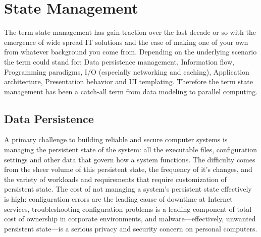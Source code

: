 \documentclass[12pt,twoside]{article}
\begin{document}
\newpage
\section{State Management}
The term state management has gain traction over the last decade or so with the emergence of wide spread IT solutions and the ease of making one of your own from whatever background you come from. Depending on the underlying scenario the term could stand for:
Data persistence management,
Information flow,
Programming paradigms,
I/O (especially networking and caching), %
Application architecture,
Presentation behavior and 
UI templating. Therefore the term state management has been a catch-all term from data modeling to parallel computing. 

\subsection{Data Persistence}

A primary challenge to building reliable and secure computer systems is managing the persistent state of the system: all the executable files, configuration settings and other data that govern how a system functions. The difficulty comes from the sheer volume of this persistent state, the frequency of it's changes, and the variety of workloads and requirements that require customization of persistent state. The cost of not managing a system's persistent state effectively is high: configuration errors are the leading cause of downtime at Internet services, troubleshooting configuration problems is a leading component of total cost of ownership in corporate environments, and malware—effectively, unwanted persistent state—is a serious privacy and security concern on personal computers.
\end{document}
